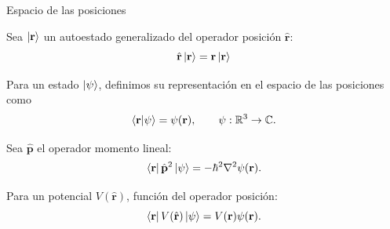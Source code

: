 \begin{frame}{Espacio de las posiciones}

    Sea $\ket{\mathbf{r}}$ un autoestado generalizado
    del operador posición $\hat{\mathbf{r}}$:
    \[
        \hat{\mathbf{r}}\ket{\mathbf{r}}
        = \mathbf{r}\ket{\mathbf{r}}
    \]

    Para un estado $\ket{\psi}$, definimos su representación
    en el espacio de las posiciones como
    \[
        \braket{\mathbf{r}}{\psi} = \psi(\mathbf{r}),
        \qquad \psi:\mathbb{R}^3\rightarrow\mathbb{C}.
    \]

    Sea $\hat{\mathbf{p}}$ el operador momento lineal:
    \[
        \bra{\mathbf{r}}\hat{\mathbf{p}}^2\ket{\psi}
        = -\hbar^2\nabla^2\psi(\mathbf{r}).
    \]

    Para un potencial $V(\hat{\mathbf{r}})$, función del
    operador posición:
    \[
        \bra{\mathbf{r}}V(\hat{\mathbf{r}})\ket{\psi}
        = V(\mathbf{r})\psi(\mathbf{r}).
    \]

\end{frame}
